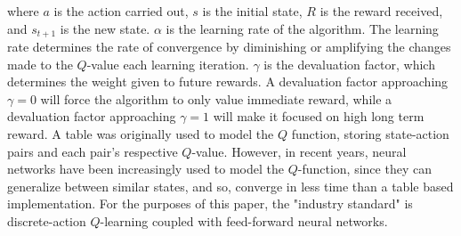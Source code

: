 \noindent
where $a$ is the action carried out, $s$ is the initial state, $R$ is the reward received, and $s_{t+1}$ is the new state.
$\alpha$ is the learning rate of the algorithm.
The learning rate determines the rate of convergence by diminishing or amplifying the changes made to the $Q$-value each learning iteration.
$\gamma$ is the devaluation factor, which determines the weight given to future rewards.
A devaluation factor approaching $\gamma=0$ will force the algorithm to only value immediate reward, while a devaluation factor approaching $\gamma=1$ will make it focused on high long term reward.
A
 table was originally used to model the $Q$ function, storing state-action pairs and each pair's respective $Q$-value.
However, in recent years, neural networks have been increasingly used to model the $Q$-function, since they can generalize between similar states, and so, converge in less time than a table based implementation.
For the purposes of this paper, the "industry standard" is discrete-action $Q$-learning coupled with feed-forward neural networks.
